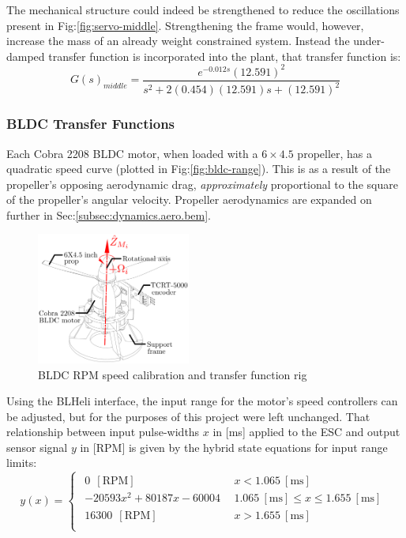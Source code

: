 \par
The mechanical structure could indeed be strengthened to reduce the oscillations present in Fig:\ref{fig:servo-middle}. Strengthening the frame would, however, increase the mass of an already weight constrained system. Instead the under-damped transfer function is incorporated into the plant, that transfer function is:
\begin{equation}\label{eq:servo-transfer-middle}
G(s)_{middle}=\frac{e^{-0.012s}(12.591)^2}{s^2+2(0.454)(12.591)s+(12.591)^2}
\end{equation}
\subsubsection*{BLDC Transfer Functions}
Each Cobra 2208 BLDC motor, when loaded with a $6\times4.5$ propeller, has a quadratic speed curve (plotted in Fig:\ref{fig:bldc-range}). This is as a result of the propeller's opposing aerodynamic drag, \emph{approximately} proportional to the square of the propeller's angular velocity. Propeller aerodynamics are expanded on further in Sec:\ref{subsec:dynamics.aero.bem}.
\begin{figure}[htbp]
\centering
\includegraphics[width=0.45\textwidth]{figs/bldc-rpm}
\caption{BLDC RPM speed calibration and transfer function rig}
\label{fig:bldc-rpm}
\vspace{-16pt}
\end{figure}
\par
Using the BLHeli interface, the input range for the motor's speed controllers can be adjusted, but for the purposes of this project were left unchanged. That relationship between input pulse-widths $x$ in [ms] applied to the ESC and output sensor signal $y$ in [RPM] is given by the hybrid state equations for input range limits:
\begin{equation}
y(x)=
\begin{cases}\begin{array}{ll}
0 ~~[\text{RPM}]& ~~x<1.065~[\text{ms}]\\
-20593x^2 + 80187x - 60004 & ~~1.065~[\text{ms}] \leq x \leq 1.655~[\text{ms}]\\
16300 ~~[\text{RPM}]& ~~x>1.655~[\text{ms}]\\
\end{array}
\end{cases}
\label{eq:bldc-range}
\end{equation}
